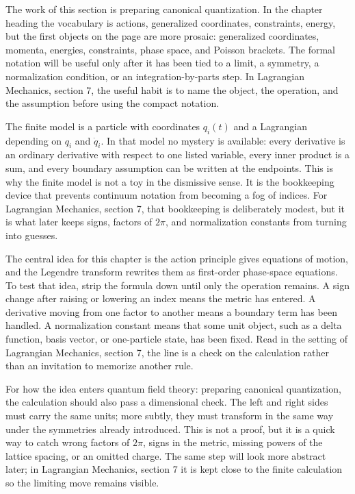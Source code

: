 The work of this section is preparing canonical quantization.  In the chapter heading the vocabulary is actions, generalized coordinates, constraints, energy, but the first objects on the page are more prosaic: generalized coordinates, momenta, energies, constraints, phase space, and Poisson brackets.  The formal notation will be useful only after it has been tied to a limit, a symmetry, a normalization condition, or an integration-by-parts step.  In Lagrangian Mechanics, section 7, the useful habit is to name the object, the operation, and the assumption before using the compact notation.

The finite model is a particle with coordinates \(q_i(t)\) and a Lagrangian depending on \(q_i\) and \(\dot q_i\).  In that model no mystery is available: every derivative is an ordinary derivative with respect to one listed variable, every inner product is a sum, and every boundary assumption can be written at the endpoints.  This is why the finite model is not a toy in the dismissive sense.  It is the bookkeeping device that prevents continuum notation from becoming a fog of indices.  For Lagrangian Mechanics, section 7, that bookkeeping is deliberately modest, but it is what later keeps signs, factors of \(2\pi\), and normalization constants from turning into guesses.

The central idea for this chapter is the action principle gives equations of motion, and the Legendre transform rewrites them as first-order phase-space equations.  To test that idea, strip the formula down until only the operation remains.  A sign change after raising or lowering an index means the metric has entered.  A derivative moving from one factor to another means a boundary term has been handled.  A normalization constant means that some unit object, such as a delta function, basis vector, or one-particle state, has been fixed.  Read in the setting of Lagrangian Mechanics, section 7, the line is a check on the calculation rather than an invitation to memorize another rule.

For how the idea enters quantum field theory: preparing canonical quantization, the calculation should also pass a dimensional check.  The left and right sides must carry the same units; more subtly, they must transform in the same way under the symmetries already introduced.  This is not a proof, but it is a quick way to catch wrong factors of \(2\pi\), signs in the metric, missing powers of the lattice spacing, or an omitted charge.  The same step will look more abstract later; in Lagrangian Mechanics, section 7 it is kept close to the finite calculation so the limiting move remains visible.


